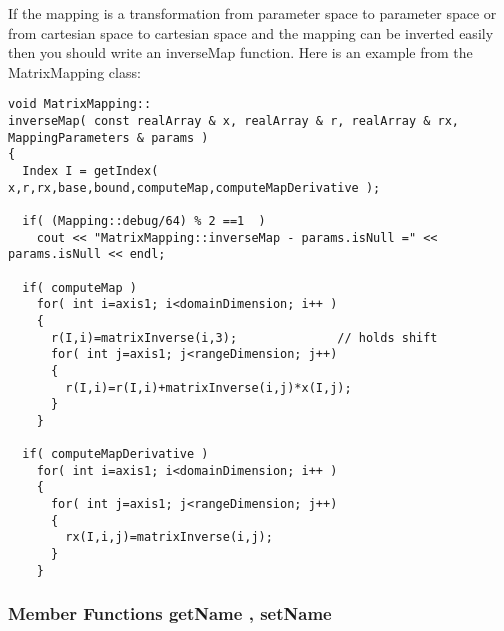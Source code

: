 \documentclass[xcolor=rgb,svgnames,dvipsnames]{article}
\begin{document}
If the mapping is a transformation from parameter space to parameter
space or from cartesian space to cartesian space and the mapping 
can be inverted easily then you should write an {\ff inverseMap} function.
Here is an example from the {\ff MatrixMapping} class:
{\footnotesize
\begin{verbatim}
void MatrixMapping::
inverseMap( const realArray & x, realArray & r, realArray & rx, MappingParameters & params )
{ 
  Index I = getIndex( x,r,rx,base,bound,computeMap,computeMapDerivative );

  if( (Mapping::debug/64) % 2 ==1  )
    cout << "MatrixMapping::inverseMap - params.isNull =" << params.isNull << endl;
  
  if( computeMap )
    for( int i=axis1; i<domainDimension; i++ )
    {
      r(I,i)=matrixInverse(i,3);              // holds shift
      for( int j=axis1; j<rangeDimension; j++)
      {
        r(I,i)=r(I,i)+matrixInverse(i,j)*x(I,j);
      }
    }

  if( computeMapDerivative )
    for( int i=axis1; i<domainDimension; i++ )
    {
      for( int j=axis1; j<rangeDimension; j++)
      {
        rx(I,i,j)=matrixInverse(i,j);
      }
    }
\end{verbatim}
}



\subsubsection{Member Functions {\ff getName} , {\ff setName} }
\end{document}
